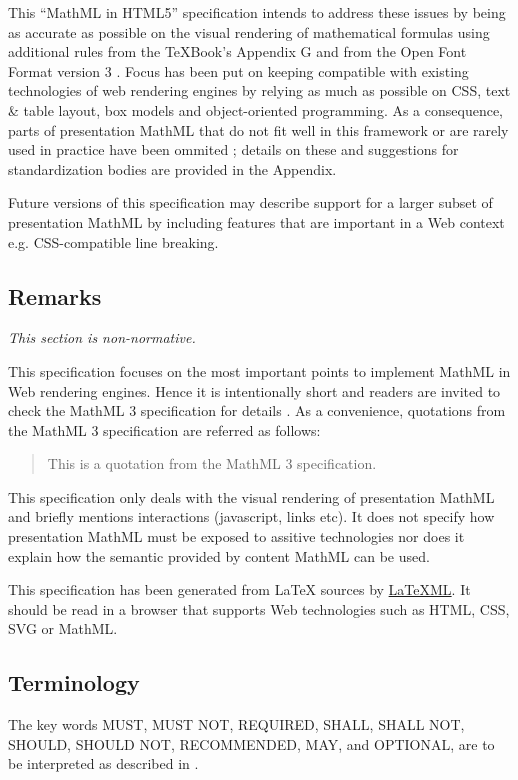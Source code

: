 This ``MathML in HTML5'' specification intends to address these issues by being
as accurate as
possible on the visual rendering of mathematical formulas using additional
rules from the \TeX Book's Appendix G \cite{TeXBook} and from
the Open Font Format version 3 \cite{OpenFontFormat3}.
Focus has been put on keeping compatible with existing technologies of web
rendering engines \cite{HTML5} by relying as much as possible on CSS, text \&
table layout, box models and object-oriented programming.
As a consequence, parts of presentation MathML
that do not fit well in this framework or are rarely used in practice
have been ommited ; details on these and suggestions for standardization bodies
are provided in the Appendix.

Future versions of this specification may describe support for a larger subset
of presentation MathML by including features that are important in a Web context
e.g. CSS-compatible line breaking.

\subsection{Remarks}

{\em This section is non-normative.}

This specification focuses on the most important points to implement
MathML in Web rendering engines. Hence it is intentionally short and readers are
invited to check the MathML 3 specification for details \cite{MathML3}.
As a convenience, quotations from the MathML 3 specification are referred as
follows:
\begin{quote}
This is a quotation from the MathML 3 specification.
\end{quote}

This specification only deals with the visual rendering of presentation MathML
and briefly mentions interactions (javascript, links etc). It does not specify
how presentation MathML must be exposed to assitive technologies nor does it
explain how the semantic provided by content MathML can be used.

This specification has been generated from LaTeX sources by
\href{http://dlmf.nist.gov/LaTeXML/}{LaTeXML}. It
should be read in a browser that supports Web technologies
such as HTML, CSS, SVG or MathML.

\subsection{Terminology}

The key words MUST, MUST NOT, REQUIRED, SHALL, SHALL NOT, SHOULD, SHOULD NOT,
RECOMMENDED, MAY, and OPTIONAL, are to be interpreted as described in
\cite{IETF RFC 2119}.
